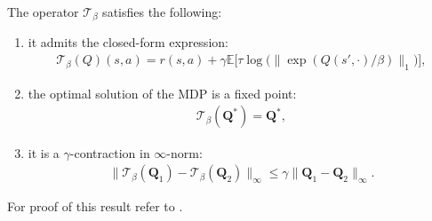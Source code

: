 \begin{lemma}
    \label{lemma:properties_of_soft_bellman}
    The operator $\mathcal{T}_\beta$ satisfies the following:
    \begin{enumerate}
        \item it admits the closed-form expression:
        \begin{align*}
            \mathcal{T}_\beta (Q)(s,a)
            = r(s,a) 
            + \gamma \mathbb{E} \Big[
                \tau \log \bigl( \| \exp(Q(s',\cdot)/\beta) \|_1 \bigr)
                \Big],
        \end{align*} 
        \item the optimal solution of the MDP is a fixed point:
        \begin{align*}
            \mathcal{T}_\beta (\bm{Q}^*)
            = \bm{Q}^*,
        \end{align*} 
        \item it is a $\gamma$-contraction in $\infty$-norm:
        \begin{align*}
            \| \mathcal{T}_\beta (\bm{Q}_1) - \mathcal{T}_\beta (\bm{Q}_2) \|_\infty
            \leq \gamma \| \bm{Q}_1 - \bm{Q}_2 \|_\infty.
        \end{align*} 
    \end{enumerate}
    For proof of this result refer to \cite{Cen2021}.
\end{lemma}

